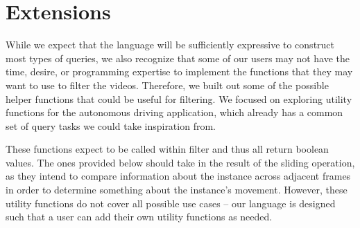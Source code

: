 
\section{Extensions}

While we expect that the language will be sufficiently expressive to construct most types of queries, we also recognize that some of our users may not have the time, desire, or programming expertise to implement the functions that they may want to use to filter the videos. 
Therefore, we built out some of the possible helper functions that could be useful for filtering. We focused on exploring utility functions for the autonomous driving application, which already has a common set of query tasks we could take inspiration from.

These functions expect to be called within filter and thus all return boolean values. 
The ones provided below should take in the result of the sliding operation, as they intend to compare information about the instance across adjacent frames in order to determine something about the instance's movement.
However, these utility functions do not cover all possible use cases -- our language is designed such that a user can add their own utility functions as needed.

